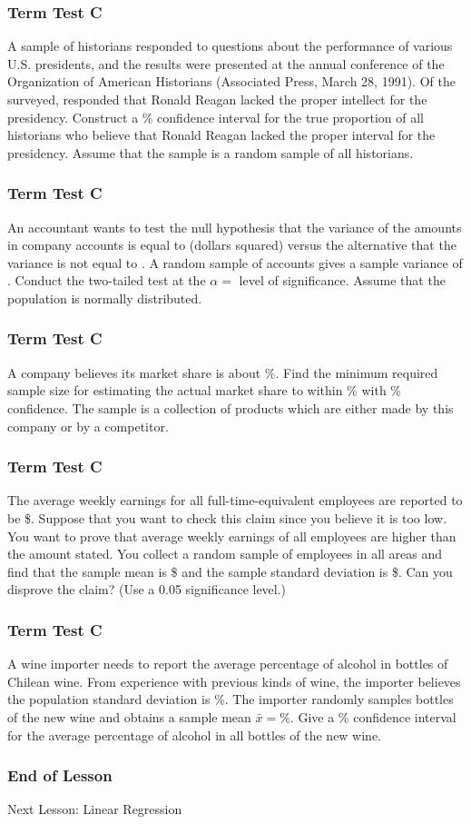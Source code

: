 \documentclass[xcolor=dvipsnames]{beamer}
\begin{document}
\begin{frame}
  \frametitle{Term Test C}
 A sample of {\ufoj} historians responded to questions
about the performance of various U.S. presidents, and the results were
presented at the annual conference of the Organization of American
Historians (Associated Press, March 28, 1991). Of the {\ufoj}
surveyed, {\mair} responded that Ronald Reagan lacked the proper
intellect for the presidency. Construct a {\utit}\% confidence
interval for the true proportion of all historians who believe that
Ronald Reagan lacked the proper interval for the presidency. Assume
that the sample is a random sample of all historians.
\end{frame}

\begin{frame}
  \frametitle{Term Test C}
 An accountant wants to test the null hypothesis that the
variance of the amounts in company accounts is equal to {\jief}
(dollars squared) versus the alternative that the variance is not
equal to {\jief}. A random sample of {\caib} accounts gives a sample
variance of {\eizi}. Conduct the two-tailed test at the
$\alpha=${\afie} level of significance. Assume that the population is
normally distributed.
\end{frame}

\begin{frame}
  \frametitle{Term Test C}
 A company believes its market share is about {\uphe}\%.
Find the minimum required sample size for estimating the actual market
share to within {\kieg}\% with {\aequ}\% confidence. The sample is a
collection of products which are either made by this company or by a
competitor.
\end{frame}

\begin{frame}
  \frametitle{Term Test C}
 The average weekly earnings for all full-time-equivalent
employees are reported to be \${\aiza}. Suppose that you want to check
this claim since you believe it is too low. You want to prove that
average weekly earnings of all employees are higher than the amount
stated. You collect a random sample of {\ajoo} employees in all areas
and find that the sample mean is \${\icoo} and the sample standard
deviation is \${\phae}. Can you disprove the claim? (Use a 0.05
significance level.)
\end{frame}

\begin{frame}
  \frametitle{Term Test C}
 A wine importer needs to report the average percentage of
alcohol in bottles of Chilean wine. From experience with previous
kinds of wine, the importer believes the population standard deviation
is {\usha}\%. The importer randomly samples {\oaga} bottles of the new
wine and obtains a sample mean $\bar{x}=${\cait}\%. Give a {\viob}\%
confidence interval for the average percentage of alcohol in all
bottles of the new wine.
\end{frame}

\begin{frame}
  \frametitle{End of Lesson}
Next Lesson: Linear Regression
\end{frame}
\end{document}
